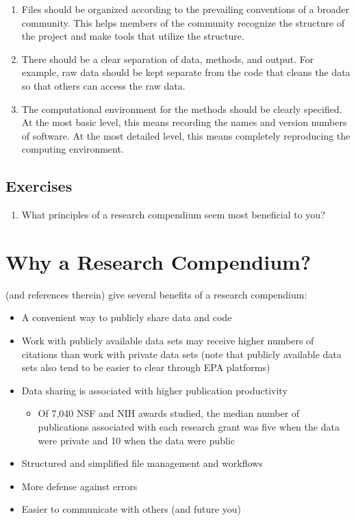 \documentclass[
]{book}
\providecommand{\tightlist}{%
  \setlength{\itemsep}{0pt}\setlength{\parskip}{0pt}}
\begin{document}
\begin{enumerate}
\def\labelenumi{\arabic{enumi}.}
\item
  Files should be organized according to the prevailing conventions of a broader community. This helps members of the community recognize the structure of the project and make tools that utilize the structure.
\item
  There should be a clear separation of data, methods, and output. For example, raw data should be kept separate from the code that cleans the data so that others can access the raw data.
\item
  The computational environment for the methods should be clearly specified. At the most basic level, this means recording the names and version numbers of software. At the most detailed level, this means completely reproducing the computing environment.
\end{enumerate}

\hypertarget{ex-set7}{%
\subsection{Exercises}\label{ex-set7}}

\begin{enumerate}
\def\labelenumi{\arabic{enumi}.}
\tightlist
\item
  What principles of a research compendium seem most beneficial to you?
\end{enumerate}

\hypertarget{why-a-rc}{%
\section{Why a Research Compendium?}\label{why-a-rc}}

\citet{marwick2018packaging} (and references therein) give several benefits of a research compendium:

\begin{itemize}
\tightlist
\item
  A convenient way to publicly share data and code
\item
  Work with publicly available data sets may receive higher numbers of citations than work with private data sets (note that publicly available data sets also tend to be easier to clear through EPA platforms)
\item
  Data sharing is associated with higher publication productivity

  \begin{itemize}
  \tightlist
  \item
    Of 7,040 NSF and NIH awards studied, the median number of publications associated with each research grant was five when the data were private and 10 when the data were public
  \end{itemize}
\item
  Structured and simplified file management and workflows
\item
  More defense against errors
\item
  Easier to communicate with others (and future you)
\end{itemize}
\end{document}
